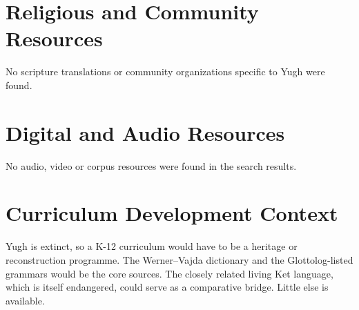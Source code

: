 \documentclass[12pt]{article}
\begin{document}
\section{Religious and Community Resources}
No scripture translations or community organizations specific to Yugh were found.

\section{Digital and Audio Resources}
No audio, video or corpus resources were found in the search results.

\section{Curriculum Development Context}
Yugh is extinct, so a K-12 curriculum would have to be a heritage or reconstruction programme. The Werner--Vajda dictionary and the Glottolog-listed grammars would be the core sources. The closely related living Ket language, which is itself endangered, could serve as a comparative bridge. Little else is available.
\end{document}
